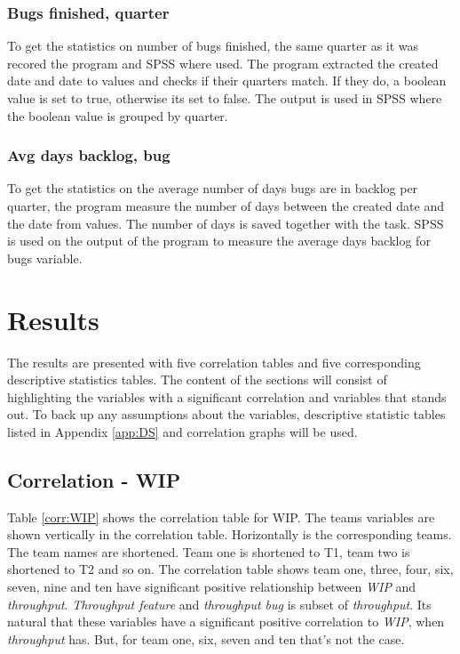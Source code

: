 \documentclass[UKenglish]{ifimaster}  %
\begin{document}
\subsection{Bugs finished, quarter}
To get the statistics on number of bugs finished, the same quarter as it was recored the program and SPSS where used. The program extracted the created date and date to values and checks if their quarters match. If they do, a boolean value is set to true, otherwise its set to false. The output is used in SPSS where the boolean value is grouped by quarter. 
\subsection{Avg days backlog, bug}
To get the statistics on the average number of days bugs are in backlog per quarter, the program measure the number of days between the created date and the date from values. The number of days is saved together with the task. SPSS is used on the output of the program to measure the average days backlog for bugs variable.



\chapter{Results}                     
\label{ch:res}
The results are presented with five correlation tables and five corresponding descriptive statistics tables.
The content of the sections will consist of highlighting the variables with a significant correlation and variables that stands out. To back up any assumptions about the variables, descriptive statistic tables listed in Appendix \ref{app:DS} and correlation graphs will be used. 

 
\section{Correlation - WIP}
\label{sec:corr:WIP}
Table \ref{corr:WIP} shows the correlation table for WIP. The teams variables are shown vertically in the correlation table. Horizontally is the corresponding teams. The team names are shortened. Team one is shortened to T1, team two is shortened to T2 and so on.
The correlation table shows team one, three, four, six, seven, nine and ten have significant positive relationship between \textit{WIP} and \textit{throughput}. \textit{Throughput feature} and \textit{throughput bug} is subset of \textit{throughput}. Its natural that these variables have a significant positive correlation to \textit{WIP}, when \textit{throughput} has. But, for team one, six, seven and ten that's not the case. 
\end{document}
